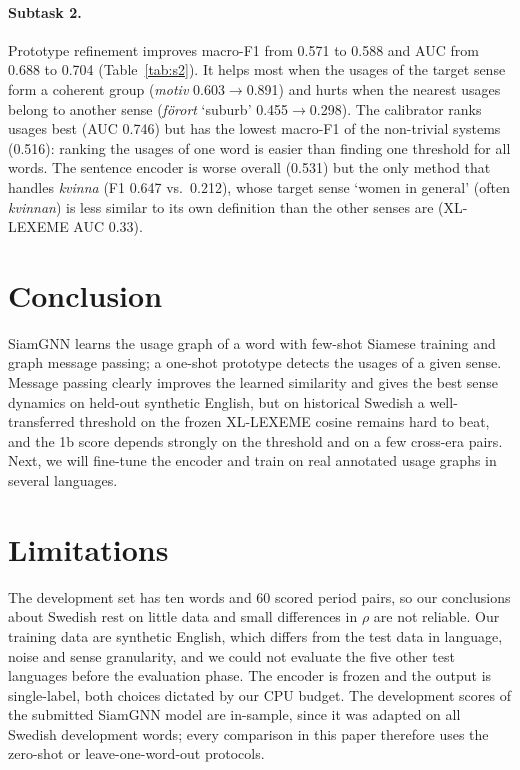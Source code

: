 \documentclass[11pt]{article}
\newcommand{\sys}{SiamGNN\xspace}
\newcommand{\xll}{XL-LEXEME\xspace}
\begin{document}
\begin{table}[t]
\centering
\small

\caption{Subtask~2 on Swedish (official per-word macro-F1; AUC averaged over words). Thresholds are chosen on the other nine words; the calibrator is trained on them and labels $p>0.5$ as positive.}
\label{tab:s2}
\end{table}

\paragraph{Subtask 2.}
Prototype refinement improves macro-F1 from 0.571 to 0.588 and AUC from 0.688 to 0.704 (Table~\ref{tab:s2}). It helps most when the usages of the target sense form a coherent group (\emph{motiv} 0.603$\rightarrow$0.891) and hurts when the nearest usages belong to another sense (\emph{förort} `suburb' 0.455$\rightarrow$0.298). The calibrator ranks usages best (AUC 0.746) but has the lowest macro-F1 of the non-trivial systems (0.516): ranking the usages of one word is easier than finding one threshold for all words. The sentence encoder is worse overall (0.531) but the only method that handles \emph{kvinna} (F1 0.647 vs.\ 0.212), whose target sense `women in general' (often \emph{kvinnan}) is less similar to its own definition than the other senses are (\xll AUC 0.33).

\section{Conclusion}

\sys learns the usage graph of a word with few-shot Siamese training and graph message passing; a one-shot prototype detects the usages of a given sense. Message passing clearly improves the learned similarity and gives the best sense dynamics on held-out synthetic English, but on historical Swedish a well-transferred threshold on the frozen \xll cosine remains hard to beat, and the 1b score depends strongly on the threshold and on a few cross-era pairs. Next, we will fine-tune the encoder and train on real annotated usage graphs in several languages.

\section*{Limitations}
The development set has ten words and 60 scored period pairs, so our conclusions about Swedish rest on little data and small differences in $\rho$ are not reliable. Our training data are synthetic English, which differs from the test data in language, noise and sense granularity, and we could not evaluate the five other test languages before the evaluation phase. The encoder is frozen and the output is single-label, both choices dictated by our CPU budget. The development scores of the submitted \sys model are in-sample, since it was adapted on all Swedish development words; every comparison in this paper therefore uses the zero-shot or leave-one-word-out protocols.
\end{document}
